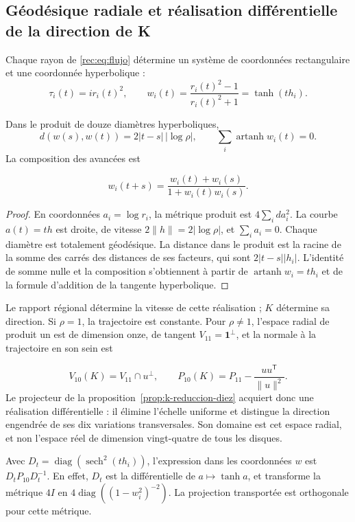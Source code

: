 \subsection{Géodésique radiale et réalisation différentielle de la direction de K}

Chaque rayon de \eqref{rec:eq:flujo} détermine un système de coordonnées rectangulaire et une coordonnée hyperbolique :
\[
 \tau_i(t)=ir_i(t)^2,\qquad
 w_i(t)=\frac{r_i(t)^2-1}{r_i(t)^2+1}=\tanh(th_i).
\]

\begin{theorem}
\label{rec:thm:geodesica}
Dans le produit de douze diamètres hyperboliques,
\begin{equation}
 d(w(s),w(t))=2|t-s|\,|\log\rho|,\qquad
 \sum_i\operatorname{artanh}w_i(t)=0.
 \label{rec:eq:geodesica}
\end{equation}
La composition des avancées est

\[
 w_i(t+s)=\frac{w_i(t)+w_i(s)}{1+w_i(t)w_i(s)}.
\]
\end{theorem}
\begin{proof}
En coordonnées \(a_i=\log r_i\), la métrique produit est \(4\sum_i da_i^2\). La courbe \(a(t)=th\) est droite, de vitesse \(2\|h\|=2|\log\rho|\), et \(\sum_i a_i=0\). Chaque diamètre est totalement géodésique. La distance dans le produit est la racine de la somme des carrés des distances de ses facteurs, qui sont \(2|t-s||h_i|\). L'identité de somme nulle et la composition s'obtiennent à partir de \(\operatorname{artanh}w_i=th_i\) et de la formule d'addition de la tangente hyperbolique.
\end{proof}

Le rapport régional détermine la vitesse de cette réalisation ; \(K\) détermine sa direction. Si \(\rho=1\), la trajectoire est constante. Pour \(\rho\ne1\), l’espace radial de produit un est de dimension onze, de tangent \(V_{11}=\mathbf1^\perp\), et la normale à la trajectoire en son sein est

\[
 V_{10}(K)=V_{11}\cap u^\perp,\qquad
 P_{10}(K)=P_{11}-\frac{uu^{\mathsf T}}{\|u\|^2}.
\]
Le projecteur de la proposition~\ref{prop:k-reduccion-diez} acquiert donc une réalisation différentielle : il élimine l’échelle uniforme et distingue la direction engendrée de ses dix variations transversales. Son domaine est cet espace radial, et non l’espace réel de dimension vingt-quatre de tous les disques.

Avec \(D_t=\operatorname{diag}(\operatorname{sech}^2(th_i))\), l’expression dans les coordonnées \(w\) est \(D_tP_{10}D_t^{-1}\). En effet, \(D_t\) est la différentielle de \(a\mapsto\tanh a\), et transforme la métrique \(4I\) en \(4\operatorname{diag}((1-w_i^2)^{-2})\). La projection transportée est orthogonale pour cette métrique.


